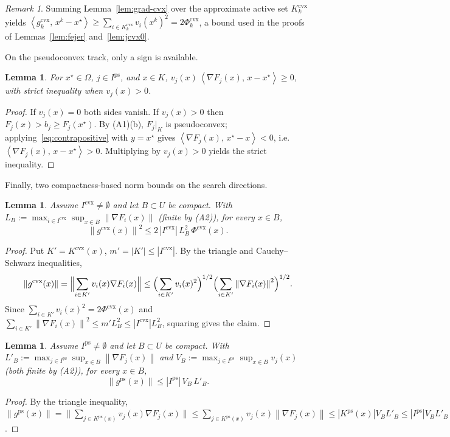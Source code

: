 \documentclass[]{interact}
\theoremstyle{plain}
\newtheorem{lemma}[theorem]{Lemma}
\theoremstyle{definition}
\theoremstyle{remark}
\newtheorem{remark}{Remark}
\newcommand{\norm}[1]{\left\lVert #1 \right\rVert}
\newcommand{\abs}[1]{\left\lvert #1 \right\rvert}
\newcommand{\inner}[2]{\left\langle #1,\, #2 \right\rangle}
\newcommand{\cvx}{\mathrm{cvx}}
\newcommand{\ps}{\mathrm{ps}}
\begin{document}
\begin{remark}\label{rem:grad-cvx-sum}
Summing Lemma~\ref{lem:grad-cvx} over the approximate active set $K^{\cvx}_k$ yields
$\inner{g^{\cvx}_k}{x^k-x^\star}\ge\sum_{i\in K^{\cvx}_k}v_i(x^k)^2=2\Phi^{\cvx}_k$, a bound
used in the proofs of Lemmas~\ref{lem:fejer} and~\ref{lem:jcvx0}.
\end{remark}

On the pseudoconvex track, only a sign is available.

\begin{lemma}\label{lem:sign-ps}
For $x^\star\in\Omega$, $j\in I^{\ps}$, and $x\in K$,
$v_j(x)\,\inner{\nabla F_j(x)}{x-x^\star}\ge 0$, with strict inequality when $v_j(x)>0$.
\end{lemma}
\begin{proof}
If $v_j(x)=0$ both sides vanish. If $v_j(x)>0$ then $F_j(x)>b_j\ge F_j(x^\star)$. By
(A1)(b), $F_j|_K$ is pseudoconvex; applying~\eqref{eq:contrapositive}
with $y=x^\star$ gives $\inner{\nabla F_j(x)}{x^\star-x}<0$, i.e.
$\inner{\nabla F_j(x)}{x-x^\star}>0$. Multiplying by $v_j(x)>0$ yields the strict
inequality.
\end{proof}

Finally, two compactness-based norm bounds on the search directions.

\begin{lemma}\label{lem:bound-cvx}
Assume $I^{\cvx}\ne\emptyset$ and let $B\subset U$ be compact. With
$L_B:=\max_{i\in I^{\cvx}}\sup_{x\in B}\norm{\nabla F_i(x)}$ (finite by (A2)), for every
$x\in B$,
\[
\norm{g^{\cvx}(x)}^2\le 2\,\abs{I^{\cvx}}\,L_B^2\,\Phi^{\cvx}(x).
\]
\end{lemma}
\begin{proof}
Put $K'=K^{\cvx}(x)$, $m'=\abs{K'}\le\abs{I^{\cvx}}$. By the triangle and Cauchy--Schwarz
inequalities,
\[
\norm{g^{\cvx}(x)}=\Bigl\|\sum_{i\in K'}v_i(x)\nabla F_i(x)\Bigr\|
\le\Bigl(\sum_{i\in K'}v_i(x)^2\Bigr)^{1/2}\Bigl(\sum_{i\in K'}\norm{\nabla F_i(x)}^2\Bigr)^{1/2}.
\]
Since $\sum_{i\in K'}v_i(x)^2=2\Phi^{\cvx}(x)$ and
$\sum_{i\in K'}\norm{\nabla F_i(x)}^2\le m'L_B^2\le\abs{I^{\cvx}}L_B^2$, squaring gives the
claim.
\end{proof}

\begin{lemma}\label{lem:bound-ps}
Assume $I^{\ps}\ne\emptyset$ and let $B\subset U$ be compact. With
$L'_B:=\max_{j\in I^{\ps}}\sup_{x\in B}\norm{\nabla F_j(x)}$ and
$V_B:=\max_{j\in I^{\ps}}\sup_{x\in B}v_j(x)$ (both finite by (A2)), for every $x\in B$,
\[
\norm{g^{\ps}(x)}\le\abs{I^{\ps}}\,V_B\,L'_B .
\]
\end{lemma}
\begin{proof}
By the triangle inequality,
$\norm{g^{\ps}(x)}=\bigl\|\sum_{j\in K^{\ps}(x)}v_j(x)\nabla F_j(x)\bigr\|
\le\sum_{j\in K^{\ps}(x)}v_j(x)\norm{\nabla F_j(x)}\le\abs{K^{\ps}(x)}V_BL'_B
\le\abs{I^{\ps}}V_BL'_B$.
\end{proof}
\end{document}
